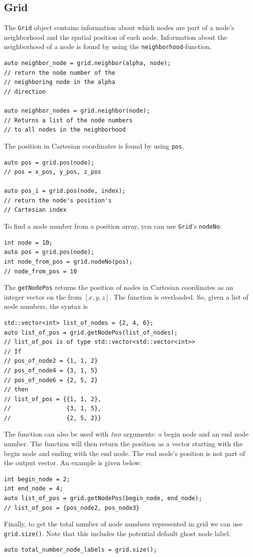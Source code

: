 \documentclass[11pt,a4paper]{report}
\begin{document}
\subsection{Grid}
\label{sec:grid}
The \texttt{Grid} object contains information about which nodes are part of a node's neighborhood and the spatial position of each node. Information about the neighborhood of a node is found by using the \texttt{neighborhood}-function,
\begin{verbatim}
auto neighbor_node = grid.neighbor(alpha, node); 
// return the node number of the 
// neighboring node in the alpha 
// direction

auto neighbor_nodes = grid.neighbor(node);  
// Returns a list of the node numbers
// to all nodes in the neighborhood                                            
\end{verbatim}
The position in Cartesian coordinates is found by using \texttt{pos},
\begin{verbatim}
auto pos = grid.pos(node); 
// pos = x_pos, y_pos, z_pos

auto pos_i = grid.pos(node, index); 
// return the node's position's 
// Cartesian index  
\end{verbatim} 
To find a node number from a position array, you can use \texttt{Grid}'s \texttt{nodeNo}:
\begin{verbatim}
int node = 10;
auto pos = grid.pos(node);
int node_from_pos = grid.nodeNo(pos); 
// node_from_pos = 10
\end{verbatim}
The \texttt{getNodePos} returns the position of nodes in Cartesian coordinates as an integer vector on the from $[x, y, z]$. The function is overloaded. So, given a list of node numbers, the syntax is 
\begin{verbatim}
std::vector<int> list_of_nodes = {2, 4, 6};
auto list_of_pos = grid.getNodePos(list_of_nodes);
// list_of_pos is of type std::vector<std::vector<int>>
// If 
// pos_of_node2 = {1, 1, 2}
// pos_of_node4 = {3, 1, 5}
// pos_of_node6 = {2, 5, 2}
// then
// list_of_pos = {{1, 1, 2}, 
//                {3, 1, 5},  
//                {2, 5, 2}}
\end{verbatim}
The function can also be used with \textit{two} arguments: a begin node and an end node number. The function will then return the position as a vector starting with the begin node and ending with the end node. The end node's position is not part of the output vector. An example is given below:  
\begin{verbatim}
int begin_node = 2;
int end_node = 4;
auto list_of_pos = grid.getNodePos(begin_node, end_node);
// list_of_pos = {pos_node2, pos_node3}
\end{verbatim}
Finally, to get the total number of node numbers represented in grid we can use \texttt{grid.size()}. Note that this includes the potential default ghost node label.
\begin{verbatim}
auto total_number_node_labels = grid.size();
\end{verbatim}
\end{document}
